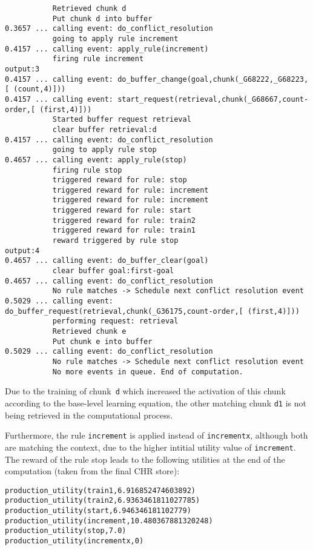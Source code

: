 \begin{lstlisting}
           Retrieved chunk d
           Put chunk d into buffer
0.3657 ... calling event: do_conflict_resolution
           going to apply rule increment
0.4157 ... calling event: apply_rule(increment)
           firing rule increment
output:3
0.4157 ... calling event: do_buffer_change(goal,chunk(_G68222,_G68223,[ (count,4)]))
0.4157 ... calling event: start_request(retrieval,chunk(_G68667,count-order,[ (first,4)]))
           Started buffer request retrieval
           clear buffer retrieval:d
0.4157 ... calling event: do_conflict_resolution
           going to apply rule stop
0.4657 ... calling event: apply_rule(stop)
           firing rule stop
           triggered reward for rule: stop
           triggered reward for rule: increment
           triggered reward for rule: increment
           triggered reward for rule: start
           triggered reward for rule: train2
           triggered reward for rule: train1
           reward triggered by rule stop
output:4
0.4657 ... calling event: do_buffer_clear(goal)
           clear buffer goal:first-goal
0.4657 ... calling event: do_conflict_resolution
           No rule matches -> Schedule next conflict resolution event
0.5029 ... calling event: do_buffer_request(retrieval,chunk(_G36175,count-order,[ (first,4)]))
           performing request: retrieval
           Retrieved chunk e
           Put chunk e into buffer
0.5029 ... calling event: do_conflict_resolution
           No rule matches -> Schedule next conflict resolution event
           No more events in queue. End of computation.
\end{lstlisting}
\flushbottom

Due to the training of chunk~\lstinline|d| which increased the activation of this chunk according to the base-level learning equation, the other matching chunk \lstinline|d1| is not being retrieved in the computational process.

Furthermore, the rule \lstinline|increment| is applied instead of \lstinline|incrementx|, although both are matching the context, due to the higher intitial utility value of \lstinline|increment|. The reward of the rule stop leads to the following utilities at the end of the computation (taken from the final CHR store):

\begin{lstlisting}
production_utility(train1,6.916852474603892)
production_utility(train2,6.9363461811027785)
production_utility(start,6.946346181102779)
production_utility(increment,10.480367881320248)
production_utility(stop,7.0)
production_utility(incrementx,0)
\end{lstlisting}


